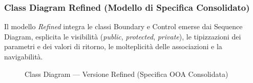 \clearpage
\subsubsection{Class Diagram Refined (Modello di Specifica Consolidato)}
Il modello \textit{Refined} integra le classi Boundary e Control emerse dai Sequence Diagram, esplicita le visibilità (\textit{public}, \textit{protected}, \textit{private}), le tipizzazioni dei parametri e dei valori di ritorno, le molteplicità delle associazioni e la navigabilità.

\begin{figure}[htbp]
    \centering
    \caption{Class Diagram --- Versione Refined (Specifica OOA Consolidata)}
    \label{fig:class_refined}
\end{figure}
